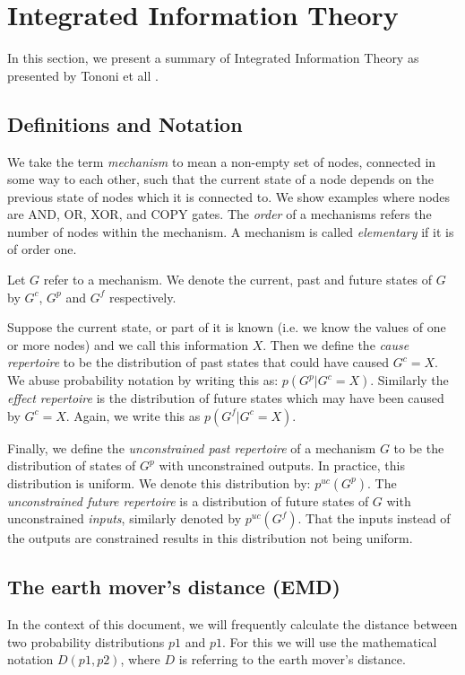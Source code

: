
\section{Integrated Information Theory}

In this section, we present a summary of Integrated Information Theory as presented by Tononi et all \cite{main}.

\subsection{Definitions and Notation}
We take the term \textit{mechanism} to mean a non-empty set of nodes, connected in some way to each other, such that the current state of a node depends on the previous state of nodes which it is connected to. We show examples where nodes are AND, OR, XOR, and COPY gates. The \textit{order} of a mechanisms refers the number of nodes within the mechanism. A mechanism is called \textit{elementary} if it is of order one.


Let $G$ refer to a mechanism. We denote the current, past and future states of $G$ by $G^c$, $G^p$ and $G^f$ respectively. 

Suppose the current state, or part of it is known (i.e. we know the values of one or more nodes) and we call this information $X$. Then we define the \textit{cause repertoire} to be the distribution of past states that could have caused $G^c = X$. We abuse probability notation by writing this as: $p(G^p | G^c = X)$. Similarly the \textit{effect repertoire} is the distribution of future states which may have been caused by $G^c = X$. Again, we write this as $p(G^f|G^c=X)$. 

Finally, we define the \textit{unconstrained past repertoire} of a mechanism $G$ to be the distribution of states of $G^p$ with unconstrained outputs. In practice, this distribution is uniform. We denote this distribution by: $p^{uc}(G^p)$. The \textit{unconstrained future repertoire} is a distribution of future states of $G$ with unconstrained \textit{inputs}, similarly denoted by $p^{uc}(G^f)$. That the inputs instead of the outputs are constrained results in this distribution not being uniform.

\subsection{The earth mover's distance (EMD)}
In the context of this document, we will frequently calculate the distance between two probability distributions $p1$ and $p1$. For this we will use the mathematical notation $D(p1,p2)$, where $D$ is referring to the earth mover's distance.

